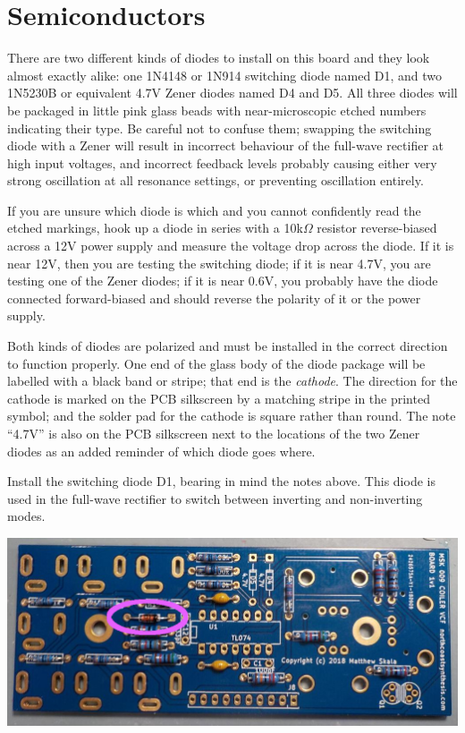 \section{Semiconductors}

There are two different kinds of diodes to install on this board and they
look almost exactly alike: one 1N4148 or 1N914 switching diode named D1, and
two 1N5230B or equivalent 4.7V Zener diodes named D4 and D5.  All three
diodes will be packaged in little pink glass beads with near-microscopic
etched numbers indicating their type.  Be careful not to confuse them;
swapping the switching diode with a Zener will result in incorrect behaviour
of the full-wave rectifier at high input voltages, and incorrect feedback
levels probably causing either very strong oscillation at all resonance
settings, or preventing oscillation entirely.

If you are unsure which diode is which and you cannot confidently read the
etched markings, hook up a diode in series with a 10k$\Omega$ resistor
reverse-biased across a 12V power supply and measure the voltage drop across
the diode.  If it is near 12V, then you are testing the switching diode; if
it is near 4.7V, you are testing one of the Zener diodes; if it is near
0.6V, you probably have the diode connected forward-biased and should
reverse the polarity of it or the power supply.

Both kinds of diodes are polarized and must be installed in the correct
direction to function properly.  One end of the glass body of the diode
package will be labelled with a black band or stripe; that end is the
\emph{cathode}.  The direction for the cathode is marked on the PCB
silkscreen by a matching stripe in the printed symbol; and the solder pad
for the cathode is square rather than round.  The note ``4.7V'' is also
on the PCB silkscreen next to the locations of the two Zener diodes as
an added reminder of which diode goes where.

\pagebreak

Install the switching diode D1, bearing in mind the notes above.  This diode
is used in the full-wave rectifier to switch between inverting and
non-inverting modes.

\nopagebreak
\noindent\includegraphics[width=\linewidth]{1n4148.jpg}

